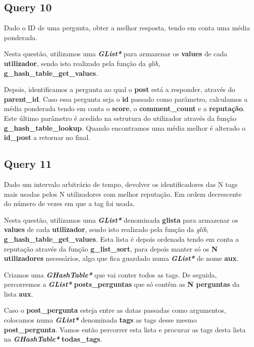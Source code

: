\documentclass[a4paper]{article}
\begin{document}
\subsection{Query 10}

Dado o ID de uma pergunta, obter a melhor resposta, tendo em conta
uma média ponderada.

Nesta questão, utilizamos uma \textit{\textbf{GList*}} para armazenar 
os \textbf{values} de cada \textbf{utilizador}, sendo isto realizado
pela função da \textit{glib}, \textbf{g\_hash\_table\_get\_values}.

Depois, identificamos a pergunta ao qual o \textbf{post} está a responder,
através do \textbf{parent\_id}. Caso essa pergunta seja o \textbf{id}
passado como parâmetro, calculamos a média ponderada tendo em conta o
\textbf{score}, o \textbf{comment\_count} e a \textbf{reputação}. Este
último parâmetro é acedido na estrutura do utilizador através da função
\textbf{g\_hash\_table\_lookup}. Quando encontramos uma média melhor é
alterado o \textbf{id\_post} a retornar no final.

\subsection{Query 11}

Dado um intervalo arbitrário de tempo, devolver os identificadores das N tags
mais usadas pelos N utilizadores com melhor reputação. Em ordem decrescente 
do número de vezes em que a tag foi usada.

Nesta questão, utilizamos uma \textit{\textbf{GList*}} denominada 
\textbf{glista} para armazenar os \textbf{values} de cada \textbf{utilizador},
sendo isto realizado pela função da \textit{glib}, 
\textbf{g\_hash\_table\_get\_values}. Esta lista é depois ordenada tendo em
conta a reputação através da função \textbf{g\_list\_sort}, para depois 
manter só os \textbf{N utilizadores} necessários, algo que fica guardado
numa \textit{\textbf{GList*}} de nome \textbf{aux}.

Criamos uma \textit{\textbf{GHashTable*}} que vai conter todos as tags.
De seguida, percorremos a \textit{\textbf{GList*}} \textbf{posts\_perguntas}
que só contêm as \textbf{N perguntas} da lista \textbf{aux}.

Caso o \textbf{post\_pergunta} esteja entre as datas passadas como argumentos,
colocamos numa \textit{\textbf{GList*}} denominada \textbf{tags} as tags desse
mesmo \textbf{post\_pergunta}. Vamos então percorrer esta lista e procurar
as tags desta lista na \textit{\textbf{GHashTable*}} \textbf{todas\_tags}.
\end{document}

